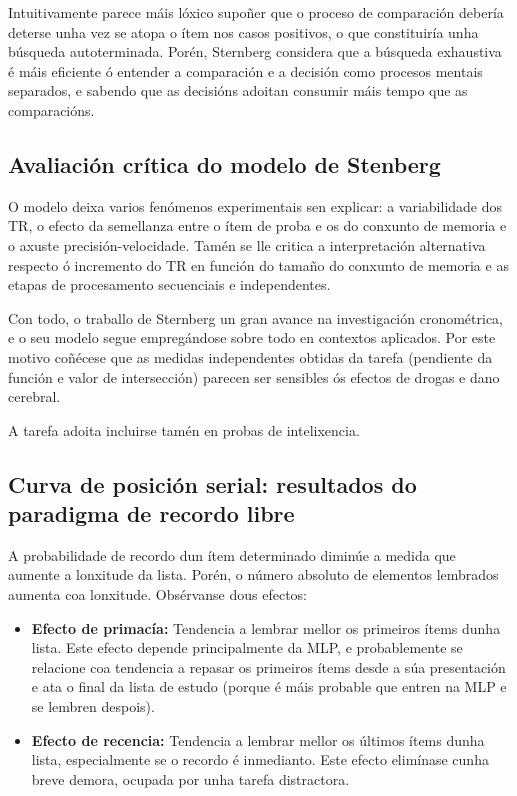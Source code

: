\documentclass[a4paper,11pt]{article}
\begin{document}
Intuitivamente parece máis lóxico supoñer que o proceso de comparación debería deterse unha vez se atopa o ítem nos casos positivos, o que constituiría unha búsqueda autoterminada. Porén, Sternberg considera que a búsqueda exhaustiva é máis eficiente ó entender a comparación e a decisión como procesos mentais separados, e sabendo que as decisións adoitan consumir máis tempo que as comparacións.

\subsection{Avaliación crítica do modelo de Stenberg}
O modelo deixa varios fenómenos experimentais sen explicar: a variabilidade dos TR, o efecto da semellanza entre o ítem de proba e os do conxunto de memoria e o axuste precisión-velocidade. Tamén se lle critica a interpretación alternativa respecto ó incremento do TR en función do tamaño do conxunto de memoria e as etapas de procesamento secuenciais e independentes. 

Con todo, o traballo de Sternberg un gran avance na investigación cronométrica, e o seu modelo segue empregándose sobre todo en contextos aplicados. Por este motivo coñécese que as medidas independentes obtidas da tarefa (pendiente da función e valor de intersección) parecen ser sensibles ós efectos de drogas e dano cerebral. 

A tarefa adoita incluirse tamén en probas de intelixencia. 

\subsection{Curva de posición serial: resultados do paradigma de recordo libre}
A probabilidade de recordo dun ítem determinado diminúe a medida que aumente a lonxitude da lista. Porén, o número absoluto de elementos lembrados aumenta coa lonxitude. Obsérvanse dous efectos:
\begin{itemize}
	\item \textbf{Efecto de primacía:} Tendencia a lembrar mellor os primeiros ítems dunha lista.
	Este efecto depende principalmente da MLP, e probablemente se relacione coa tendencia a repasar
	os primeiros ítems desde a súa presentación e ata o final da lista de estudo (porque é máis
	probable que entren na MLP e se lembren despois).
	\item \textbf{Efecto de recencia:} Tendencia a lembrar mellor os últimos ítems dunha lista,
	especialmente se o recordo é inmedianto. Este efecto elimínase cunha breve demora, ocupada por
	unha tarefa distractora.
\end{itemize}
\end{document}

